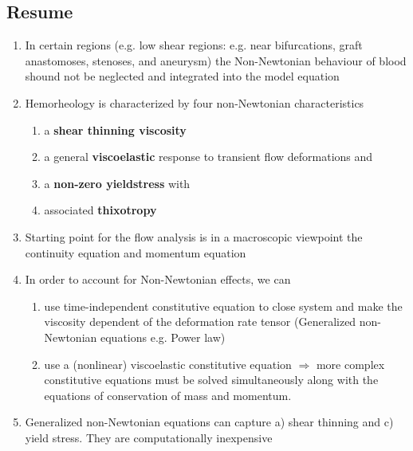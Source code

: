 \documentclass[11pt,letterpaper]{article}
\begin{document}



\newpage
\subsection*{Resume}
\begin{enumerate}
    \item In certain regions (e.g. low shear regions: e.g. near bifurcations, graft anastomoses, stenoses, and  aneurysm) the Non-Newtonian behaviour of blood shound not be neglected and integrated into the model equation
    \item Hemorheology is characterized by 
four non-Newtonian characteristics 
\begin{enumerate}
 \item a \textbf{shear thinning viscosity}
 \item a general \textbf{viscoelastic} response to transient flow deformations and 
 \item a \textbf{non-zero yieldstress} with
 \item associated \textbf{thixotropy}
\end{enumerate}
    \item Starting point for the flow analysis is in a macroscopic viewpoint the continuity equation and momentum equation
    \item In order to account for Non-Newtonian effects, we can\begin{enumerate}
        \item use time-independent constitutive equation to close system and make the viscosity dependent of the deformation rate tensor (Generalized non-Newtonian equations e.g. Power law)
        \item use a (nonlinear) viscoelastic constitutive equation $\Rightarrow$ more complex constitutive equations must be solved simultaneously along with the equations of conservation of mass and momentum.
    \end{enumerate}  
\item  Generalized non-Newtonian equations can capture a) shear thinning and c) yield stress. They are computationally inexpensive

\end{enumerate}
\end{document}
